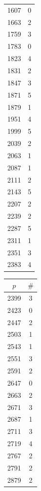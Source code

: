 \documentclass[10pt,a4paper]{amsart}
\begin{document}
\begin{table}[htbp]
\begin{minipage}{0.135\textwidth}
\begin{tabular}{c|c}
        1607 & 0 \\
        1663 & 2 \\
        1759 & 3 \\
        1783 & 0 \\
        1823 & 4 \\
        1831 & 2 \\
        1847 & 3 \\
        1871 & 5 \\
        1879 & 1 \\
        1951 & 4 \\
        1999 & 5 \\
        2039 & 2 \\
        2063 & 1 \\
        2087 & 1 \\
        2111 & 2 \\
        2143 & 5 \\
        2207 & 2 \\
        2239 & 2 \\
        2287 & 5 \\
        2311 & 1 \\
        2351 & 3 \\
        2383 & 4
    \end{tabular}
\end{minipage}\hspace{-2mm}
%
\begin{minipage}{0.135\textwidth}
    \centering
    \begin{tabular}{c|c}
        $p$ & $\#$ \\ \hline
        2399 & 3 \\
        2423 & 0 \\
        2447 & 2 \\
        2503 & 1 \\
        2543 & 1 \\
        2551 & 3 \\
        2591 & 2 \\
        2647 & 0 \\
        2663 & 2 \\
        2671 & 3 \\
        2687 & 1 \\
        2711 & 3 \\
        2719 & 4 \\
        2767 & 2 \\
        2791 & 2 \\
        2879 & 2 \\

\end{tabular}
\end{minipage}
\end{table}
\end{document}
